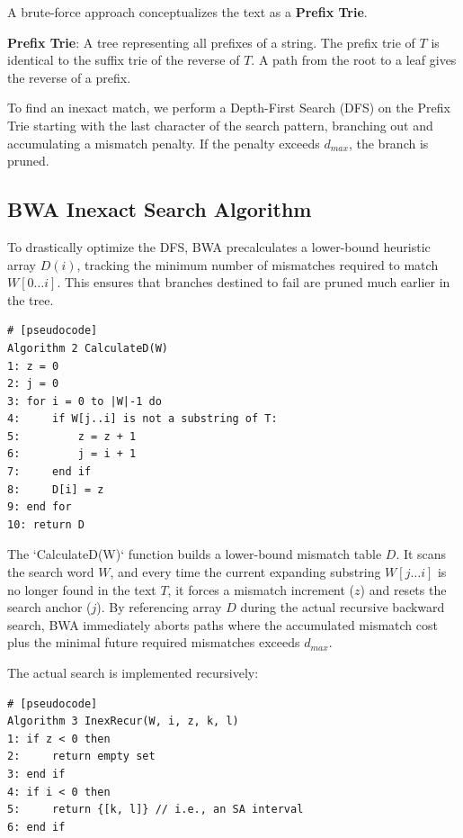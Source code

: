 \documentclass[11pt, a4paper]{article}
\newenvironment{important}{%
    \begin{tcolorbox}[colback=blue!5!white,colframe=blue!75!black,title=Important Concept]
}{%
    \end{tcolorbox}
}
\begin{document}
A brute-force approach conceptualizes the text as a \textbf{Prefix Trie}. 
\begin{important}
    \textbf{Prefix Trie}: A tree representing all prefixes of a string. The prefix trie of $T$ is identical to the suffix trie of the reverse of $T$. A path from the root to a leaf gives the reverse of a prefix.
\end{important}

To find an inexact match, we perform a Depth-First Search (DFS) on the Prefix Trie starting with the last character of the search pattern, branching out and accumulating a mismatch penalty. If the penalty exceeds $d_{max}$, the branch is pruned. 

\subsection{BWA Inexact Search Algorithm}
To drastically optimize the DFS, BWA precalculates a lower-bound heuristic array $D(i)$, tracking the minimum number of mismatches required to match $W[0 \dots i]$. This ensures that branches destined to fail are pruned much earlier in the tree.

\begin{verbatim}
# [pseudocode]
Algorithm 2 CalculateD(W)
1: z = 0
2: j = 0
3: for i = 0 to |W|-1 do
4:     if W[j..i] is not a substring of T:
5:         z = z + 1
6:         j = i + 1
7:     end if
8:     D[i] = z
9: end for
10: return D
\end{verbatim}

The `CalculateD(W)` function builds a lower-bound mismatch table $D$. It scans the search word $W$, and every time the current expanding substring $W[j \dots i]$ is no longer found in the text $T$, it forces a mismatch increment ($z$) and resets the search anchor ($j$). By referencing array $D$ during the actual recursive backward search, BWA immediately aborts paths where the accumulated mismatch cost plus the minimal future required mismatches exceeds $d_{max}$.

The actual search is implemented recursively:
\begin{verbatim}
# [pseudocode]
Algorithm 3 InexRecur(W, i, z, k, l)
1: if z < 0 then
2:     return empty set
3: end if
4: if i < 0 then
5:     return {[k, l]} // i.e., an SA interval
6: end if

\end{verbatim}
\end{document}
